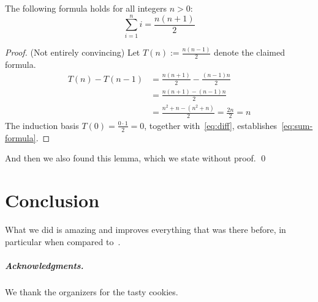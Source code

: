 \documentclass[a4paper,english,numberwithinsect]{eurocg18}
\begin{document}
\begin{lemma}
  The following formula holds
  for all integers $n>0$\textup:
\begin{equation}
  \label{eq:sum-formula}
  \sum_{i=1}^{n} i = \frac{n(n+1)}{2}
\end{equation}
\end{lemma}
\begin{proof} (Not entirely convincing)
Let \(T(n) := \frac{n(n-1)}{2}\) denote the claimed formula.
\begin{align}
  T(n) - T(n-1) &= \frac{n(n+1)}{2} - \frac{(n-1)n}{2}
\nonumber
  \\
                &= \frac{n(n+1) - (n-1)n}{2}
\nonumber
  \\
                &= \frac{n^2+n - (n^2+n)}{2} = \frac {2n}{2} = n
\label{eq:diff}                  
\end{align}
The induction basis $T(0)=\frac{0\cdot 1}2 = 0$, together with~\eqref{eq:diff},
establishes~\eqref{eq:sum-formula}.
\end{proof}

\begin{lemma}
  And then we also found this lemma, which we state without proof.
  \qed
\end{lemma}

\section{Conclusion}

What we did is amazing and improves everything that was there before,
in particular when compared to~\cite{k-taocp-11}.


\subparagraph*{Acknowledgments.} We thank the organizers for
the tasty cookies.


\end{document}
